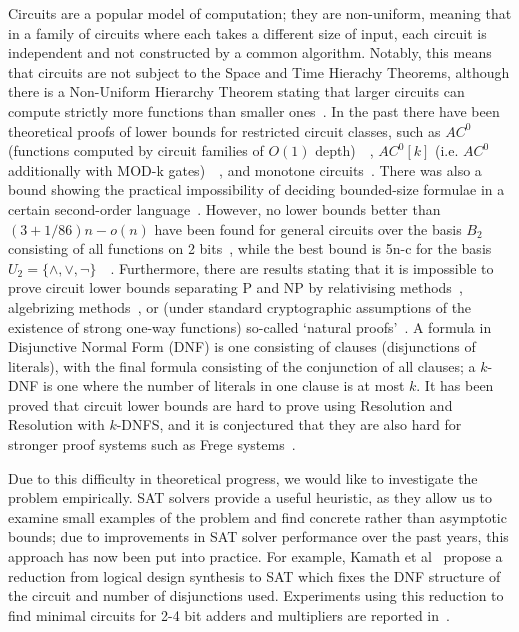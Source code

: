 \documentclass{article}
\begin{document}
Circuits are a popular model of computation; they are non-uniform, meaning that in a family of circuits where each takes a different size of input, each circuit is independent and not constructed by a common algorithm. Notably, this means that circuits are not subject to the Space and Time Hierachy Theorems, although there is a Non-Uniform Hierarchy Theorem stating that larger circuits can compute strictly more functions than smaller ones~\cite{arora}. In the past there have been theoretical proofs of lower bounds for restricted circuit classes, such as $AC^0$ (functions computed by circuit families of $O(1)$ depth)~\cite{furst81}~\cite{ajtai83}, $AC^0[k]$ (i.e. $AC^0$ additionally with MOD-k gates)~\cite{razborov87}~\cite{smolensky87}, and monotone circuits~\cite{razborov85}. There was also a bound showing the practical impossibility of deciding bounded-size formulae in a certain second-order language~\cite{stockmeyer02}. However, no lower bounds better than $(3+1/86)n-o(n)$ have been found for general circuits over the basis $B_2$ consisting of all functions on 2 bits~\cite{find16}, while the best bound is 5n-c for the basis $U_2 = \{ \land, \lor, \neg\}$~\cite{lachish01}~\cite{iwama02}. Furthermore, there are results stating that it is impossible to prove circuit lower bounds separating P and NP by relativising methods~\cite{baker75}, algebrizing methods~\cite{aaronson09}, or (under standard cryptographic assumptions of the existence of strong one-way functions) so-called `natural proofs'~\cite{razborov94}. A formula in Disjunctive Normal Form (DNF) is one consisting of clauses (disjunctions of literals), with the final formula consisting of the conjunction of all clauses; a $k$-DNF is one where the number of literals in one clause is at most $k$. It has been proved that circuit lower bounds are hard to prove using Resolution and Resolution with $k$-DNFS, and it is conjectured that they are also hard for stronger proof systems such as Frege systems~\cite{raz}. 

Due to this difficulty in theoretical progress, we would like to investigate the problem empirically. SAT solvers provide a useful heuristic, as they allow us to examine small examples of the problem and find concrete rather than asymptotic bounds; due to improvements in SAT solver performance over the past years, this approach has now been put into practice. For example, Kamath et al~\cite{kamath} propose a reduction from logical design synthesis to SAT which fixes the DNF structure of the circuit and number of disjunctions used. Experiments using this reduction to find minimal circuits for 2-4 bit adders and multipliers are reported in~\cite{estrada}. 
\end{document}
